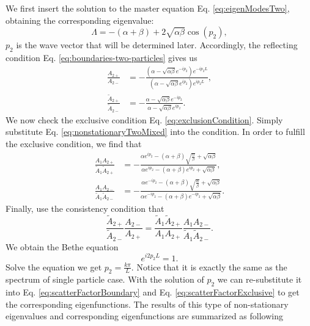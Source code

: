 We first insert the solution to the master equation Eq. \eqref{eq:eigenModesTwo}, obtaining the corresponding eigenvalue:
\begin{equation}
    \label{eq:eigenvaluesTwoMixed}
    \Lambda = -(\alpha+\beta) + 2\sqrt{\alpha\beta}\cos(p_2), 
\end{equation} 
$p_2$ is the wave vector that will be determined later. Accordingly, the reflecting condition Eq. \eqref{eq:boundaries-two-particles} gives us
\begin{subequations}
    \label{eq:scatterFactorBoundary}
    \begin{align}
        \frac{A_{2+}}{A_{2-}} & =  -\frac{\left(\alpha-\sqrt{\alpha\beta} e^{-ip_2}\right) e^{-ip_2L}}{\left(\alpha-\sqrt{\alpha\beta} e^{ip_2}\right) e^{ip_2L}}, \\
        \frac{\tilde{A}_{2+}}{\tilde{A}_{2-}} & =  -\frac{\alpha - \sqrt{\alpha\beta} e^{-ip_2}}{\alpha-\sqrt{\alpha\beta} e^{ip_2}}.
    \end{align}
\end{subequations}
We now check the exclusive condition Eq. \eqref{eq:exclusionCondition}. Simply substitute Eq.  \eqref{eq:nonstationaryTwoMixed} into the condition. In order to fulfill the exclusive condition, we find that 
\begin{subequations}
    \label{eq:scatterFactorExclusive}
    \begin{align}
        \frac{A_{1}A_{2+}}{\tilde{A}_{1}\tilde{A}_{2+}} & =  -\frac{\alpha e^{ip_2}-(\alpha+\beta) \sqrt{\frac{\alpha}{\beta}} + \sqrt{\alpha\beta} }{\alpha e^{ip_2} -(\alpha+\beta)e^{ip_2} + \sqrt{\alpha\beta} },\\
        \frac{A_{1}A_{2-}}{\tilde{A}_{1}\tilde{A}_{2-}} & =  -\frac{\alpha e^{-ip_2}-(\alpha+\beta) \sqrt{\frac{\alpha}{\beta}} + \sqrt{\alpha\beta} }{\alpha e^{-ip_2} -(\alpha+\beta)e^{-ip_2} + \sqrt{\alpha\beta} }.
    \end{align}
\end{subequations}
Finally, use the consistency condition that
\begin{equation}
    \label{eq:consistencyConditionTwo}
    \frac{\tilde{A}_{2+}}{\tilde{A}_{2-}}\frac{A_{2-}}{A_{2+}} = \frac{\tilde{A}_{1}\tilde{A}_{2+}}{A_{1}A_{2+}} \frac{A_{1}A_{2-}}{\tilde{A}_{1}\tilde{A}_{2-}}.
\end{equation}
We obtain the Bethe equation 
\begin{equation}
    \label{eq:betheEqTwoMixed}
    e^{i2p_2L} = 1.
\end{equation}
Solve the equation we get $p_2=\frac{k\pi}{L}$. Notice that it is exactly the same as the spectrum of single particle case. With the solution of $p_2$ we can re-substitute it into Eq. \eqref{eq:scatterFactorBoundary} and Eq.  \eqref{eq:scatterFactorExclusive} to get the corresponding eigenfunctions. The results of this type of non-stationary eigenvalues and corresponding eigenfunctions are summarized as following 

